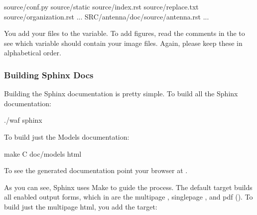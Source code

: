 \documentclass[letterpaper,10pt,english]{sphinxmanual}
\renewcommand{\sphinxcode}[1]{\texttt{\small{#1}}}
\begin{document}
\begin{sphinxVerbatim}[commandchars=\\\{\}]
  
        source/conf.py 
        source/\PYGZus{}static 
        source/index.rst 
        source/replace.txt 
        source/organization.rst 
        ...
        SRC/antenna/doc/source/antenna.rst 
        ...
\end{sphinxVerbatim}

You add your \sphinxcode{} files to the \sphinxcode{} variable.  To add figures,
read the comments in the \sphinxcode{} to see which variable should contain
your image files.  Again, please keep these in alphabetical order.


\subsubsection{Building Sphinx Docs}
\label{\detokenize{documentation:building-sphinx-docs}}
Building the Sphinx documentation is pretty simple.
To build all the Sphinx documentation:

\begin{sphinxVerbatim}[commandchars=\\\{\}]
\PYGZdl{} ./waf sphinx
\end{sphinxVerbatim}

To build just the Models documentation:

\begin{sphinxVerbatim}[commandchars=\\\{\}]
\PYGZdl{} make \PYGZhy{}C doc/models html
\end{sphinxVerbatim}

To see the generated documentation point your browser at
\sphinxcode{}.

As you can see, Sphinx uses Make to guide the process.
The default target builds all enabled output forms, which in
 are the multi\sphinxhyphen{}page \sphinxcode{}, single\sphinxhyphen{}page \sphinxcode{}, and pdf
(\sphinxcode{}).  To build just the multi\sphinxhyphen{}page html, you add the \sphinxcode{} target:
\end{document}
